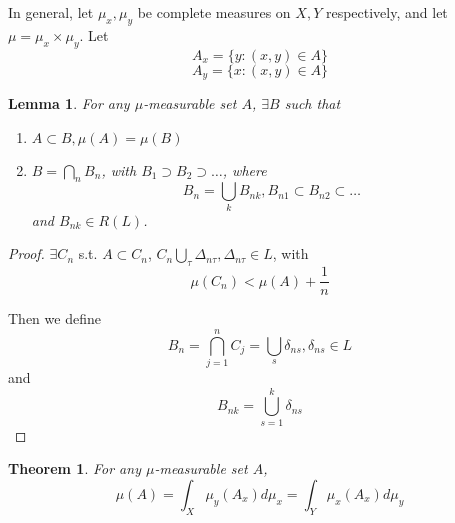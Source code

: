 \documentclass[11pt,a4paper]{report}
\newtheorem{lemma}[theorem]{Lemma}
\theoremstyle{plain}
\newtheorem{thm}{Theorem}[section]
\theoremstyle{definition}
\theoremstyle{remark}
\newcommand{\Union}{\bigcup}
\newcommand{\Intersection}{\bigcap}
\begin{document}
In general, let $\mu_x, \mu_y$ be complete measures on $X, Y$ respectively, and let $\mu = \mu_x \times \mu_y$. Let
$$ A_x = \{ y : (x, y) \in A \} $$
$$ A_y = \{ x : (x, y) \in A \} $$

\begin{lemma}
  For any $\mu$-measurable set $A$, $\exists B$ such that
  \begin{enumerate}
     \item $A \subset B, \mu(A) = \mu(B)$
     \item $ B = \Intersection_n B_n$, with $B_1 \supset B_2 \supset \dots$, where
         $$ B_n = \Union_k B_{nk}, B_{n1} \subset B_{n2} \subset \dots $$
        and $B_{nk} \in R(L)$.
  \end{enumerate}
\end{lemma}

\begin{proof}
    $\exists C_n$ s.t. $A \subset C_n$, $C_n \Union_{\tau} \Delta_{n\tau}, \Delta_{n\tau} \in L$, with 
    $$\mu(C_n) < \mu(A) + \frac{1}{n}$$

    Then we define 
    $$ B_n = \Intersection_{j=1}^n C_j = \Union_s \delta_{ns}, \delta_{ns} \in L $$
    and
    $$ B_{nk} = \Union_{s=1}^k \delta_{ns} $$
\end{proof}

\begin{thm}
  \label{measure_of_product_set_is_integral_over_each_dimension}
  For any $\mu$-measurable set $A$,
  $$ \mu(A) = \int_X \mu_y(A_x) d \mu_x = \int_Y \mu_x(A_x) d\mu_y $$
\end{thm}
\end{document}
